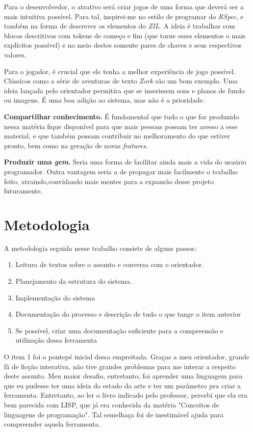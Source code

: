Para o desenvolvedor, o atrativo será criar jogos de uma forma que deverá ser a
mais intuitiva possível. Para tal, inspirei-me no estilo de programar do
\emph{RSpec}, e também na forma de descrever os elementos do \emph{ZIL}. A ideia
é trabalhar com blocos descritivos com tokens de começo e fim (que torne esses
elementos o mais explícitos possível) e no meio destes somente pares de chaves e
seus respectivos valores.

Para o jogador, é crucial que ele tenha a melhor experiência de jogo possível.
Clássicos como a série de aventuras de texto \emph{Zork} \citep{Zork} são um bom
exemplo. Uma ideia lançada pelo orientador permitira que se inserissem sons e
planos de fundo ou imagens. É uma boa adição ao sistema, mas não é a prioridade.

\textbf{Compartilhar conhecimento.} É fundamental que tudo o que for produzido
nessa matéria fique disponível para que mais pessoas possam ter acesso a esse
material, e que também possam contribuir no melhoramento do que estiver pronto,
bem como na geração de novas \emph{features}.

\textbf{Produzir uma \emph{gem}.} Seria uma forma de facilitar ainda mais a vida
do usuário programador. Outra vantagem seria a de propagar mais facilmente o
trabalho feito, atraindo,convidando mais mentes para a expansão desse projeto
futuramente.

\section{Metodologia}
\label{sec:methodology}

A metodologia seguida nesse trabalho consiste de alguns passos:
\begin{enumerate}
  \item Leitura de textos sobre o assunto e conversa com o orientador.
  \item Planejamento da estrutura do sistema.
  \item Implementação do sistema
  \item Documentação do processo e descrição de tudo o que tange o item anterior
  \item Se possível, criar uma documentação suficiente para a compreensão e
  utilização dessa ferramenta
\end{enumerate}

O item 1 foi o pontepé inicial dessa empreitada. Graças a meu orientador, grande
fã de ficção interativa, não tive grandes problemas para me interar a respeito
deste assunto. Meu maior desafio, entretanto, foi aprender uma linguagem para
que eu pudesse ter uma ideia do estado da arte e ter um parâmetro pra criar a
ferramenta. Entretanto, ao ler o livro \citet{Zil:95} indicado pelo professor,
percebi que ela era bem parecida com LISP, que já era conhecida da matéria
"Conceitos de linguagens de programação". Tal semelhaça foi de inestimável ajuda
para compreender aquela ferramenta.

